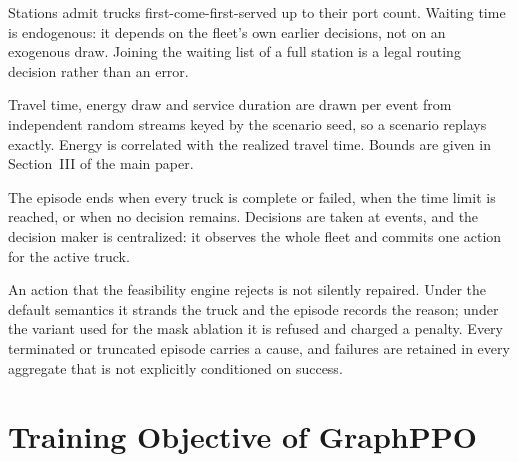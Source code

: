\documentclass[journal]{IEEEtran}
\begin{document}
\begin{description}[leftmargin=*,nosep]
\item[Queueing.] Stations admit trucks first-come-first-served up to their port
count. Waiting time is endogenous: it depends on the fleet's own earlier
decisions, not on an exogenous draw. Joining the waiting list of a full station
is a legal routing decision rather than an error.
\item[Uncertainty.] Travel time, energy draw and service duration are drawn per
event from independent random streams keyed by the scenario seed, so a scenario
replays exactly. Energy is correlated with the realized travel time. Bounds are
given in Section~III of the main paper.
\item[Horizon and information.] The episode ends when every truck is complete or
failed, when the time limit is reached, or when no decision remains. Decisions
are taken at events, and the decision maker is centralized: it observes the
whole fleet and commits one action for the active truck.
\item[Fallback.] An action that the feasibility engine rejects is not silently
repaired. Under the default semantics it strands the truck and the episode
records the reason; under the variant used for the mask ablation it is refused
and charged a penalty. Every terminated or truncated episode carries a cause,
and failures are retained in every aggregate that is not explicitly conditioned
on success.
\end{description}

\section{Training Objective of GraphPPO}
\end{document}
